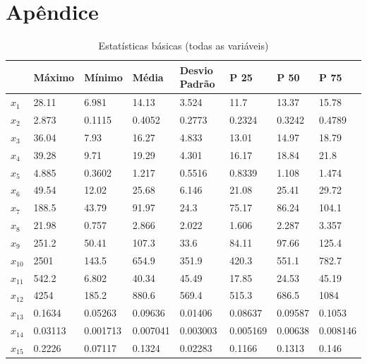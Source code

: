 \documentclass[11pt,a4paper]{article}
\numberwithin{equation}{section}
\begin{document}
\section{Apêndice}
\begin{table}[H]
\centering
\caption{Estatísticas básicas (todas as variáveis)}
\label{my-label}
\begin{tabular}{llllllll} \hline
         & Máximo  & Mínimo   & Média    & Desvio Padrão & P 25         & P 50         & P 75         \\ \hline
$x_{1}$  & 28.11   & 6.981    & 14.13    & 3.524         & 11.7         & 13.37        & 15.78        \\
$x_{2}$  & 2.873   & 0.1115   & 0.4052   & 0.2773        & 0.2324       & 0.3242       & 0.4789       \\
$x_{3}$  & 36.04   & 7.93     & 16.27    & 4.833         & 13.01        & 14.97        & 18.79        \\
$x_{4}$  & 39.28   & 9.71     & 19.29    & 4.301         & 16.17        & 18.84        & 21.8         \\
$x_{5}$  & 4.885   & 0.3602   & 1.217    & 0.5516        & 0.8339       & 1.108        & 1.474        \\
$x_{6}$  & 49.54   & 12.02    & 25.68    & 6.146         & 21.08        & 25.41        & 29.72        \\
$x_{7}$  & 188.5   & 43.79    & 91.97    & 24.3          & 75.17        & 86.24        & 104.1        \\
$x_{8}$  & 21.98   & 0.757    & 2.866    & 2.022         & 1.606        & 2.287        & 3.357        \\
$x_{9}$  & 251.2   & 50.41    & 107.3    & 33.6          & 84.11        & 97.66        & 125.4        \\
$x_{10}$ & 2501    & 143.5    & 654.9    & 351.9         & 420.3        & 551.1        & 782.7        \\
$x_{11}$ & 542.2   & 6.802    & 40.34    & 45.49         & 17.85        & 24.53        & 45.19        \\
$x_{12}$ & 4254    & 185.2    & 880.6    & 569.4         & 515.3        & 686.5        & 1084         \\
$x_{13}$ & 0.1634  & 0.05263  & 0.09636  & 0.01406       & 0.08637      & 0.09587      & 0.1053       \\
$x_{14}$ & 0.03113 & 0.001713 & 0.007041 & 0.003003      & 0.005169     & 0.00638      & 0.008146     \\
$x_{15}$ & 0.2226  & 0.07117  & 0.1324   & 0.02283       & 0.1166       & 0.1313       & 0.146        \\

\end{tabular}
\end{table}
\end{document}
